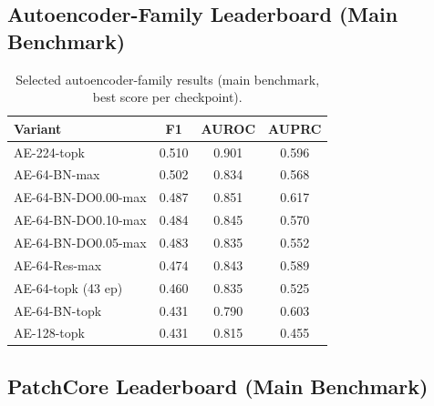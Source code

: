 \documentclass[11pt]{article}
\begin{document}
\subsection{Autoencoder-Family Leaderboard (Main Benchmark)}

\begin{table}[H]
\centering
\caption{Selected autoencoder-family results (main benchmark, best score per checkpoint).}
\label{tab:appendix_ae}
\begin{tabular}{lccc}
\toprule
Variant & F1 & AUROC & AUPRC \\
\midrule
AE-224-topk               & 0.510 & 0.901 & 0.596 \\
AE-64-BN-max              & 0.502 & 0.834 & 0.568 \\
AE-64-BN-DO0.00-max       & 0.487 & 0.851 & 0.617 \\
AE-64-BN-DO0.10-max       & 0.484 & 0.845 & 0.570 \\
AE-64-BN-DO0.05-max       & 0.483 & 0.835 & 0.552 \\
AE-64-Res-max             & 0.474 & 0.843 & 0.589 \\
AE-64-topk (43 ep)        & 0.460 & 0.835 & 0.525 \\
AE-64-BN-topk             & 0.431 & 0.790 & 0.603 \\
AE-128-topk               & 0.431 & 0.815 & 0.455 \\
\bottomrule
\end{tabular}
\end{table}

\subsection{PatchCore Leaderboard (Main Benchmark)}
\end{document}
